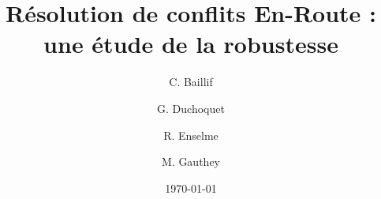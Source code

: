 \documentclass[11pt,twoside]{report}
\begin{document}

\title{Résolution de conflits En-Route : une étude de la robustesse}
\author{C. Baillif \and G. Duchoquet \and R. Enselme \and M. Gauthey}
\date{\today}
\maketitle
	
	
		

	
	\tableofcontents
	
		
	\cleardoublepage

		
	
	
	
	
	

	
	
	
	\appendix
	

	
	
\end{document}
